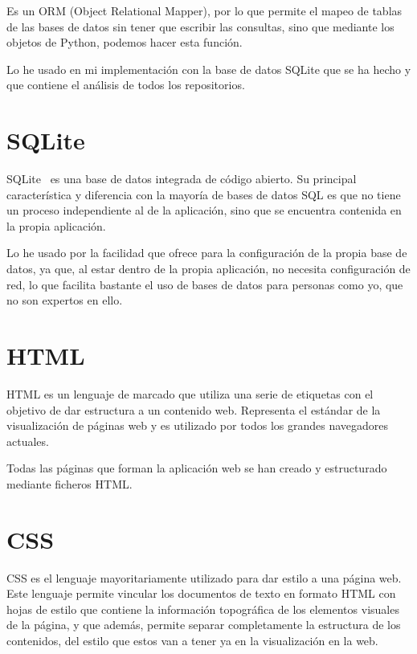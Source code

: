 \documentclass[a4paper, 12pt]{book}
\begin{document}
Es un ORM (Object Relational Mapper), por lo que permite el mapeo de tablas de las bases de datos sin tener que escribir las consultas, sino que mediante los objetos de Python, podemos hacer esta función.

Lo he usado en mi implementación con la base de datos SQLite que se ha hecho y que contiene el análisis de todos los repositorios.

\section{SQLite}
\label{sec:SQLite}

SQLite~\cite{sqlite:_sqlite} es una base de datos integrada de código abierto. Su principal característica y diferencia con la mayoría de bases de datos SQL es que no tiene un proceso independiente al de la aplicación, sino que se encuentra contenida en la propia aplicación.

Lo he usado por la facilidad que ofrece para la configuración de la propia base de datos, ya que, al estar dentro de la propia aplicación, no necesita configuración de red, lo que facilita bastante el uso de bases de datos para personas como yo, que no son expertos en ello.

\section{HTML}
\label{sec:HTML}

HTML es un lenguaje de marcado que utiliza una serie de etiquetas con el objetivo de dar estructura a un contenido web. Representa el estándar de la visualización de páginas web y es utilizado por todos los grandes navegadores actuales.

Todas las páginas que forman la aplicación web se han creado y estructurado mediante ficheros HTML.

\section{CSS}
\label{sec:CSS}

CSS es el lenguaje mayoritariamente utilizado para dar estilo a una página web. Este lenguaje permite vincular los documentos de texto en formato HTML con hojas de estilo que contiene la información topográfica de los elementos visuales de la página, y que además, permite separar completamente la estructura de los contenidos, del estilo que estos van a tener ya en la visualización en la web.
\end{document}
